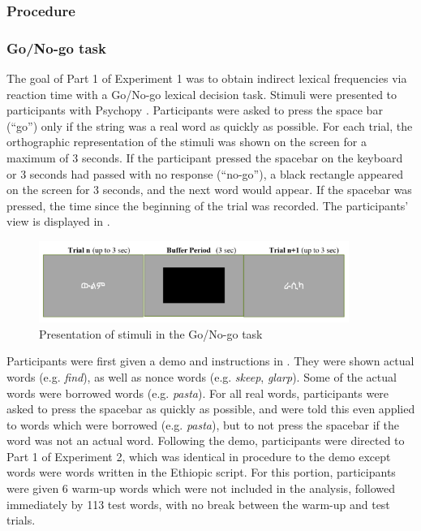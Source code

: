 \documentclass[output=paper
,newtxmath
,modfonts
,nonflat]{langsci/langscibook}
\begin{document}
\subsubsection{Procedure}\label{sec:moeng:6.1.2}
\subsubsection{Go/No-go task}\label{sec:moeng:6.1.2.1}

The goal of Part 1 of Experiment 1 was to obtain indirect lexical frequencies via reaction time with a Go/No-go lexical decision task. Stimuli were presented to participants with Psychopy \citep{peirce2007psychopy}. Participants were asked to press the space bar (“go”) only if the string was a real word as quickly as possible. For each trial, the orthographic representation of the stimuli was shown on the screen for a maximum of 3 seconds. If the participant pressed the spacebar on the keyboard or 3 seconds had passed with no response (“no-go”), a black rectangle appeared on the screen for 3 seconds, and the next word would appear. If the spacebar was pressed, the time since the beginning of the trial was recorded. The participants’ view is displayed in .

   

\begin{figure}
\includegraphics[width=0.9\textwidth]{figures/fig-moeng-4}
\caption{Presentation of stimuli in the Go/No-go task}
\label{fig:moeng:5}
\end{figure}

Participants were first given a demo and instructions in . They were shown actual  words (e.g. \textit{find}), as well as nonce words (e.g. \textit{skeep}, \textit{glarp}). Some of the actual words were borrowed words (e.g. \textit{pasta}). For all real words, participants were asked to press the spacebar as quickly as possible, and were told this even applied to words which were borrowed (e.g. \textit{pasta}), but to not press the spacebar if the word was not an actual  word. Following the  demo, participants were directed to Part 1 of Experiment 2, which was identical in procedure to the  demo except words were  words written in the Ethiopic script. For this portion, participants were given 6 warm-up words which were not included in the analysis, followed immediately by 113 test words, with no break between the warm-up and test trials.
\end{document}
